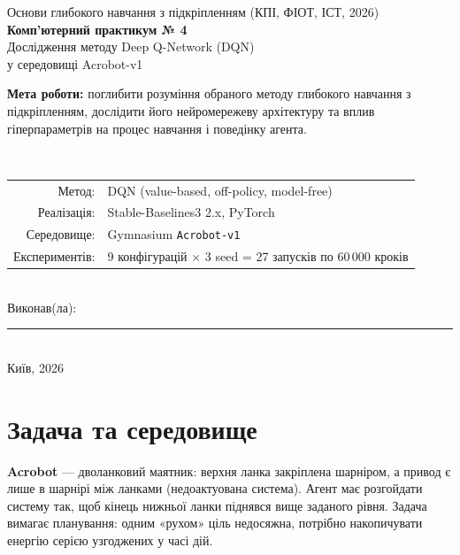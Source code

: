 \documentclass[11pt,a4paper]{article}
\newcommand{\code}[1]{\texttt{#1}}
\begin{document}
\sloppy

\begin{titlepage}
\centering
{\large Основи глибокого навчання з підкріпленням (КПІ, ФІОТ, ІСТ, 2026)}\\[3cm]
{\LARGE\bfseries Комп'ютерний практикум № 4}\\[0.6cm]
{\Large Дослідження методу Deep Q-Network (DQN)\\ у середовищі Acrobot-v1}\\[1.5cm]
\begin{minipage}{0.8\textwidth}\small
\textbf{Мета роботи:} поглибити розуміння обраного методу глибокого навчання з підкріпленням, дослідити його нейромережеву архітектуру та вплив гіперпараметрів на процес навчання і поведінку агента.
\end{minipage}\\[2.5cm]
\begin{tabular}{rl}
Метод: & DQN (value-based, off-policy, model-free)\\
Реалізація: & Stable-Baselines3 2.x, PyTorch\\
Середовище: & Gymnasium \code{Acrobot-v1}\\
Експериментів: & 9 конфігурацій $\times$ 3 seed = 27 запусків по 60\,000 кроків\\
\end{tabular}\\[3cm]
Виконав(ла): \rule{6cm}{0.4pt}\\[0.5cm]
Київ, 2026
\end{titlepage}

\tableofcontents
\newpage

\section{Задача та середовище}

\textbf{Acrobot} — дволанковий маятник: верхня ланка закріплена шарніром, а привод є лише в шарнірі між ланками (недоактуована система). Агент має розгойдати систему так, щоб кінець нижньої ланки піднявся вище заданого рівня. Задача вимагає планування: одним «рухом» ціль недосяжна, потрібно накопичувати енергію серією узгоджених у часі дій.
\end{document}
